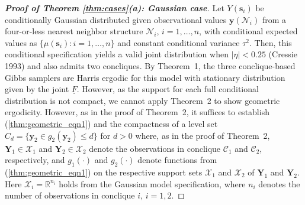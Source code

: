 \documentclass[12pt]{article}
\theoremstyle{definition}
\begin{document}
\begin{proof}[\bf Proof of Theorem \ref{thm:cases}(a): Gaussian case]
Let $Y(\boldsymbol s_i)$ be conditionally Gaussian distributed given observational values $\boldsymbol y(\mathcal{N}_i)$ from a four-or-less nearest   neighbor structure $\mathcal{N}_i$, $i=1,\ldots,n$,  with conditional expected values as $\{\mu(\boldsymbol s_i): i = 1, \dots, n\}$ and constant conditional variance $\tau^2$.
Then,  this conditional specification yields a valid joint distribution when $|\eta| < 0.25$ (Cressie 1993) and also admits two concliques.  By Theorem~1,    the three conclique-based Gibbs samplers are  Harris ergodic  for this model with stationary distribution given by the joint $\underline{F}$.     However, as the support for each full conditional distribution   is not compact, we cannot apply Theorem~2 to show geometric ergodicity. However, as in the proof of Theorem~2, it suffices to establish (\ref{thm:geometric_eqn1}) and the compactness of a level set $C_d = \{\boldsymbol y_2 \in g_{2}(\boldsymbol y_2) \le d\}$ for $d >0$ where, as in the proof of Theorem~2, $\boldsymbol Y_1 \in \mathcal{X}_1$ and $\boldsymbol Y_2 \in \mathcal{X}_2$ denote the observations in conclique $\mathcal{C}_1$ and $\mathcal{C}_2$, respectively, and $g_{1}(\cdot)$ and $g_{2}(\cdot)$ denote functions from  (\ref{thm:geometric_eqn1}) on the respective support sets $\mathcal{X}_1$ and $\mathcal{X}_2$ of $\boldsymbol Y_1$ and $\boldsymbol Y_2$. Here $\mathcal{X}_i = \mathbb{R}^{n_i}$ holds from the Gaussian model specification, where $n_i$ denotes the number of observations in conclique $i$, $i = 1, 2$.



\end{proof}
\end{document}
